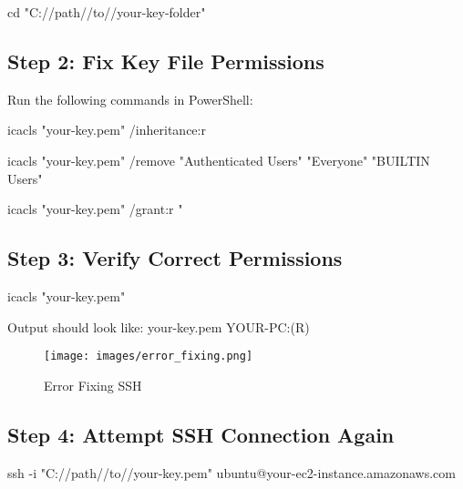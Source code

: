 \documentclass{article}
\begin{document}
\begin{tcolorbox}[colback=gray!10, colframe=black, title=Navigate to Key Folder]
cd "C://path//to//your-key-folder"
\end{tcolorbox}

\subsection{Step 2: Fix Key File Permissions}
Run the following commands in PowerShell:

\begin{tcolorbox}[colback=gray!10, colframe=black, title=Remove Inherited Permissions]
icacls "your-key.pem" /inheritance:r
\end{tcolorbox}

\begin{tcolorbox}[colback=gray!10, colframe=black, title=Remove Unauthorized Users]
icacls "your-key.pem" /remove "Authenticated Users" "Everyone" "BUILTIN\\Users"
\end{tcolorbox}

\begin{tcolorbox}[colback=gray!10, colframe=black, title=Grant Read-Only Access to Current User]
icacls "your-key.pem" /grant:r "%
\end{tcolorbox}

\subsection{Step 3: Verify Correct Permissions}

\begin{tcolorbox}[colback=gray!10, colframe=black, title=Check Key File Permissions]
icacls "your-key.pem"
\end{tcolorbox}

Output should look like:
your-key.pem YOUR-PC\YourUsername:(R)

\begin{figure}[h]
  \centering
  \texttt{[image: images/error\_fixing.png]}
  \caption{Error Fixing SSH}
  \label{fig:ssh connect-fix}
\end{figure}


\subsection{Step 4: Attempt SSH Connection Again}

\begin{tcolorbox}[colback=gray!10, colframe=black, title=SSH Command]
ssh -i "C://path//to//your-key.pem" ubuntu@your-ec2-instance.amazonaws.com
\end{tcolorbox}
\end{document}
